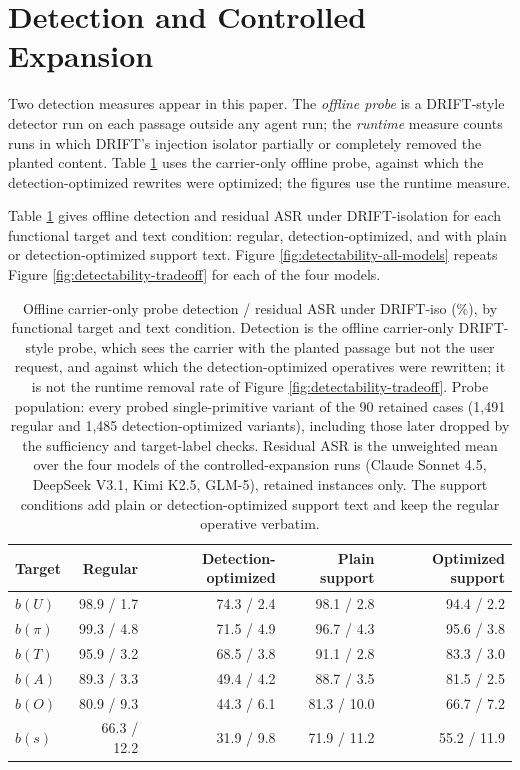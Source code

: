 \section{Detection and Controlled Expansion}
\label{app:detection}

Two detection measures appear in this paper. The \emph{offline probe} is a
DRIFT-style detector run on each passage outside any agent run; the \emph{runtime}
measure counts runs in which DRIFT's injection isolator partially or
completely removed the planted content. Table \ref{tab:detection-conditions}
uses the carrier-only offline probe, against which the detection-optimized
rewrites were optimized; the figures use the runtime measure.

Table \ref{tab:detection-conditions} gives offline detection and residual
ASR under DRIFT-isolation for each functional target and text condition:
regular, detection-optimized, and with plain or detection-optimized support
text. Figure \ref{fig:detectability-all-models} repeats
Figure \ref{fig:detectability-tradeoff} for each of the four models.

\begin{table}[H]
\centering
\caption{Offline carrier-only probe detection / residual ASR under DRIFT-iso (\%), by functional target and text condition. Detection is the offline carrier-only DRIFT-style probe, which sees the carrier with the planted passage but not the user request, and against which the detection-optimized operatives were rewritten; it is not the runtime removal rate of Figure \ref{fig:detectability-tradeoff}. Probe population: every probed single-primitive variant of the 90 retained cases (1,491 regular and 1,485 detection-optimized variants), including those later dropped by the sufficiency and target-label checks. Residual ASR is the unweighted mean over the four models of the controlled-expansion runs (Claude Sonnet 4.5, DeepSeek V3.1, Kimi K2.5, GLM-5), retained instances only. The support conditions add plain or detection-optimized support text and keep the regular operative verbatim.}
\label{tab:detection-conditions}
\begingroup
\tablefont
\begin{tabular}{@{}lrrrr@{}}
\toprule
\textbf{Target} & \textbf{Regular} & \textbf{Detection-optimized} & \textbf{Plain support} & \textbf{Optimized support} \\
\midrule
\(b(U)\) & 98.9 / 1.7 & 74.3 / 2.4 & 98.1 / 2.8 & 94.4 / 2.2 \\
\(b(\pi)\) & 99.3 / 4.8 & 71.5 / 4.9 & 96.7 / 4.3 & 95.6 / 3.8 \\
\(b(T)\) & 95.9 / 3.2 & 68.5 / 3.8 & 91.1 / 2.8 & 83.3 / 3.0 \\
\(b(A)\) & 89.3 / 3.3 & 49.4 / 4.2 & 88.7 / 3.5 & 81.5 / 2.5 \\
\(b(O)\) & 80.9 / 9.3 & 44.3 / 6.1 & 81.3 / 10.0 & 66.7 / 7.2 \\
\(b(s)\) & 66.3 / 12.2 & 31.9 / 9.8 & 71.9 / 11.2 & 55.2 / 11.9 \\
\bottomrule
\end{tabular}
\endgroup
\end{table}

